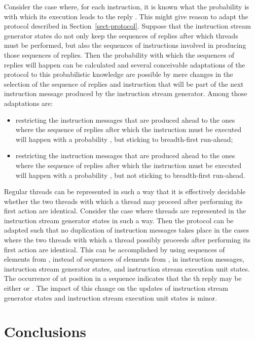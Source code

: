 \documentclass[fleqn]{llncs}
\begin{document}
Consider the case where, for each instruction, it is known what the
probability is with which its execution leads to the reply .
This might give reason to adapt the protocol described in
Section~\ref{sect-protocol}.
Suppose that the instruction stream generator states do not only keep
the sequences of replies after which threads must be performed, but also
the sequences of instructions involved in producing those sequences of
replies.
Then the probability with which the sequences of replies will happen can
be calculated and several conceivable adaptations of the protocol to
this probabilistic knowledge are possible by mere changes in the
selection of the sequence of replies and instruction that will be part
of the next instruction message produced by the instruction stream
generator.
Among those adaptations are:
\begin{itemize}
\item
restricting the instruction messages that are produced ahead to the ones
where the sequence of replies after which the instruction must be
executed will happen with a probability , but sticking to
breadth-first run-ahead;
\item
restricting the instruction messages that are produced ahead to the ones
where the sequence of replies after which the instruction must be
executed will happen with a probability , but not sticking to
breadth-first run-ahead.
\end{itemize}

Regular threads can be represented in such a way that it is effectively
decidable whether the two threads with which a thread may proceed after
performing its first action are identical.
Consider the case where threads are represented in the instruction
stream generator states in such a way.
Then the protocol can be adapted such that no duplication of instruction
messages takes place in the cases where the two threads with which a
thread possibly proceeds after performing its first action are
identical.
This can be accomplished by using sequences of elements from
, instead of sequences of elements from ,
in instruction messages, instruction stream generator states, and
instruction stream execution unit states.
The occurrence of  at position  in a sequence indicates that the
th reply may be either  or .
The impact of this change on the updates of instruction stream generator
states and instruction stream execution unit states is minor.

\section{Conclusions}
\label{sect-concl}
\end{document}
